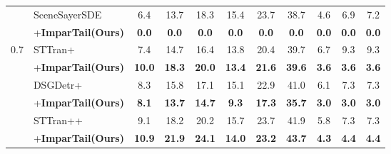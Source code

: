 \begin{table}[!h]
{\begin{tabular}{l|l|ccccccccc}
          \cmidrule(lr){3-11} 
        &        SceneSayerSDE~\cite{peddi_et_al_scene_sayer_2024} & 6.4 & 13.7 & 18.3 & 15.4 & 23.7 & 38.7 & 4.6 & 6.9 & 7.2  \\ 
        &        \quad+\textbf{ImparTail(Ours)} & \cellcolor{highlightColor} \textbf{0.0} & \cellcolor{highlightColor} \textbf{0.0} & \cellcolor{highlightColor} \textbf{0.0} & \cellcolor{highlightColor} \textbf{0.0} & \cellcolor{highlightColor} \textbf{0.0} & \cellcolor{highlightColor} \textbf{0.0} & \cellcolor{highlightColor} \textbf{0.0} & \cellcolor{highlightColor} \textbf{0.0} & \cellcolor{highlightColor} \textbf{0.0}  \\ 
          \cmidrule(lr){3-11} 
        \multirow{12}{*}{0.7} &        STTran+~\cite{peddi_et_al_scene_sayer_2024} & 7.4 & 14.7 & 16.4 & 13.8 & 20.4 & 39.7 & 6.7 & 9.3 & 9.3  \\ 
        &        \quad+\textbf{ImparTail(Ours)} & \cellcolor{highlightColor} \textbf{10.0} & \cellcolor{highlightColor} \textbf{18.3} & \cellcolor{highlightColor} \textbf{20.0} & \cellcolor{highlightColor} \textbf{13.4} & \cellcolor{highlightColor} \textbf{21.6} & \cellcolor{highlightColor} \textbf{39.6} & \cellcolor{highlightColor} \textbf{3.6} & \cellcolor{highlightColor} \textbf{3.6} & \cellcolor{highlightColor} \textbf{3.6}  \\ 
          \cmidrule(lr){3-11} 
        &        DSGDetr+~\cite{peddi_et_al_scene_sayer_2024} & 8.3 & 15.8 & 17.1 & 15.1 & 22.9 & 41.0 & 6.1 & 7.3 & 7.3  \\ 
        &        \quad+\textbf{ImparTail(Ours)} & \cellcolor{highlightColor} \textbf{8.1} & \cellcolor{highlightColor} \textbf{13.7} & \cellcolor{highlightColor} \textbf{14.7} & \cellcolor{highlightColor} \textbf{9.3} & \cellcolor{highlightColor} \textbf{17.3} & \cellcolor{highlightColor} \textbf{35.7} & \cellcolor{highlightColor} \textbf{3.0} & \cellcolor{highlightColor} \textbf{3.0} & \cellcolor{highlightColor} \textbf{3.0}  \\ 
          \cmidrule(lr){3-11} 
        &        STTran++~\cite{peddi_et_al_scene_sayer_2024} & 9.1 & 18.2 & 20.2 & 15.7 & 23.7 & 41.9 & 5.8 & 7.3 & 7.3  \\ 
        &        \quad+\textbf{ImparTail(Ours)} & \cellcolor{highlightColor} \textbf{10.9} & \cellcolor{highlightColor} \textbf{21.9} & \cellcolor{highlightColor} \textbf{24.1} & \cellcolor{highlightColor} \textbf{14.0} & \cellcolor{highlightColor} \textbf{23.2} & \cellcolor{highlightColor} \textbf{43.7} & \cellcolor{highlightColor} \textbf{4.3} & \cellcolor{highlightColor} \textbf{4.4} & \cellcolor{highlightColor} \textbf{4.4}  \\ 

\end{tabular}}
\end{table}
